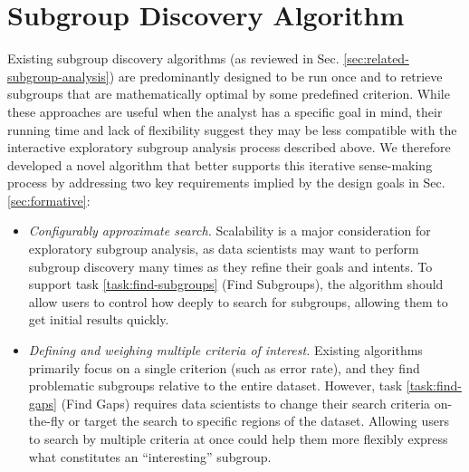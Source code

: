 \section{Subgroup Discovery Algorithm}
\label{sec:algorithm}

Existing subgroup discovery algorithms (as reviewed in Sec. \ref{sec:related-subgroup-analysis}) are predominantly designed to be run once and to retrieve subgroups that are mathematically optimal by some predefined criterion.
While these approaches are useful when the analyst has a specific goal in mind, their running time and lack of flexibility suggest they may be less compatible with the interactive exploratory subgroup analysis process described above.
We therefore developed a novel algorithm that better supports this iterative sense-making process by addressing two key requirements implied by the design goals in Sec. \ref{sec:formative}: 

\begin{itemize}
    \item \textit{Configurably approximate search.} Scalability is a major consideration for exploratory subgroup analysis, as data scientists may want to perform subgroup discovery many times as they refine their goals and intents. To support task \ref{task:find-subgroups} (Find Subgroups), the algorithm should allow users to control how deeply to search for subgroups, allowing them to get initial results quickly.
    \item \textit{Defining and weighing multiple criteria of interest.} Existing algorithms~\cite{chung_slice_2020,pastor_looking_2021} primarily focus on a single criterion (such as error rate), and they find problematic subgroups relative to the entire dataset. However, task \ref{task:find-gaps} (Find Gaps) requires data scientists to change their search criteria on-the-fly or target the search to specific regions of the dataset. Allowing users to search by multiple criteria at once could help them more flexibly express what constitutes an ``interesting'' subgroup.
\end{itemize}

